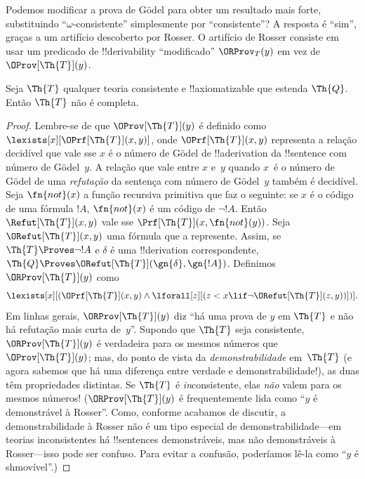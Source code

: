 \documentclass[../../../include/open-logic-section]{subfiles}
\begin{document}


Podemos modificar a prova de G\"odel para obter um resultado mais forte,
substituindo ``$\omega$-consistente'' simplesmente por ``consistente''? A
resposta é ``sim'', graças a um artifício descoberto por Rosser. O artifício
de Rosser consiste em usar um predicado de !!{derivability} ``modificado''
$\ORProv_T(y)$ em vez de $\OProv[\Th{T}](y)$.

\begin{thm}
Seja $\Th{T}$ qualquer teoria consistente e !!{axiomatizable} que
estenda $\Th{Q}$. Então $\Th{T}$ não é completa.
\end{thm}

\begin{proof}
Lembre-se de que $\OProv[\Th{T}](y)$ é definido como
$\lexists[x][\OPrf[\Th{T}](x, y)]$, onde $\OPrf[\Th{T}](x, y)$ representa
a relação decidível que vale sse $x$ é o número de G\"odel de
!!a{derivation} da !!{sentence} com número de G\"odel~$y$. A relação que
vale entre $x$ e~$y$ quando $x$~é o número de G\"odel de uma
\emph{refutação} da sentença com número de G\"odel~$y$ também é decidível.
Seja $\fn{not}(x)$ a função recursiva primitiva que faz o seguinte: se $x$
é o código de uma fórmula $!A$, $\fn{not}(x)$ é um código de $\lnot !A$.
Então $\Refut[\Th{T}](x, y)$ vale sse
$\Prf[\Th{T}](x, \fn{not}(y))$. Seja $\ORefut[\Th{T}](x, y)$ uma fórmula
que a represente. Assim, se $\Th{T} \Proves \lnot !A$ e $\delta$ é uma
!!{derivation} correspondente, $\Th{Q} \Proves
\ORefut[\Th{T}](\gn{\delta}, \gn{!A})$. Definimos $\ORProv[\Th{T}](y)$ como
\[
\lexists[x][(\OPrf[\Th{T}](x,y) \land \lforall[z][(z < x \lif \lnot
  \ORefut[\Th{T}](z,y))])].
\]
Em linhas gerais, $\ORProv[\Th{T}](y)$ diz ``há uma prova de $y$ em
$\Th{T}$ e não há refutação mais curta de~$y$''. Supondo que $\Th{T}$ seja
consistente, $\ORProv[\Th{T}](y)$ é verdadeira para os mesmos números que
$\OProv[\Th{T}](y)$; mas, do ponto de vista da \emph{demonstrabilidade}
em~$\Th{T}$ (e agora sabemos que há uma diferença entre verdade e
demonstrabilidade!), as duas têm propriedades distintas. Se $\Th{T}$ é
\emph{in}consistente, elas \emph{não} valem para os mesmos números!{}
($\ORProv[\Th{T}](y)$ é frequentemente lida como ``$y$ é demonstrável à
Rosser''. Como, conforme acabamos de discutir, a demonstrabilidade à Rosser
não é um tipo especial de demonstrabilidade---em teorias inconsistentes há
!!{sentence}s demonstráveis, mas não demonstráveis à Rosser---isso pode ser
confuso. Para evitar a confusão, poderíamos lê-la como ``$y$ é
shmovível''.)


\end{proof}
\end{document}

